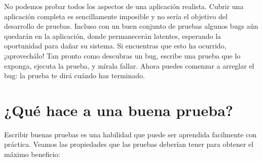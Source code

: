 \documentclass[a4paper,10pt,twoside]{book}
\begin{document}

No podemos probar todos los aspectos de una aplicaci\'on realista.
Cubrir una aplicaci\'on completa es sencillamente imposible y no ser\'ia el objetivo del desarrollo de pruebas.
Incluso con un buen conjunto de pruebas
algunos bugs a\'un quedar\'an en la aplicaci\'on, donde permanecer\'an latentes, esperando la oportunidad para da\~nar su sistema.
Si encuentras que esto ha ocurrido, ¡aprovech\'alo!
Tan pronto como descubras un bug, escribe una prueba que lo exponga, ejecuta la prueba, y m\'irala fallar.
Ahora puedes comenzar a arreglar el bug: la prueba te dir\'a cu\'ando has terminado.

\section{¿Qu\'e hace a una buena prueba?}

Escribir buenas pruebas es una habilidad que puede ser aprendida facilmente con pr\'actica.
Veamos las propiedades que las pruebas deber\'ian tener para obtener el m\'aximo beneficio: 
\end{document}
